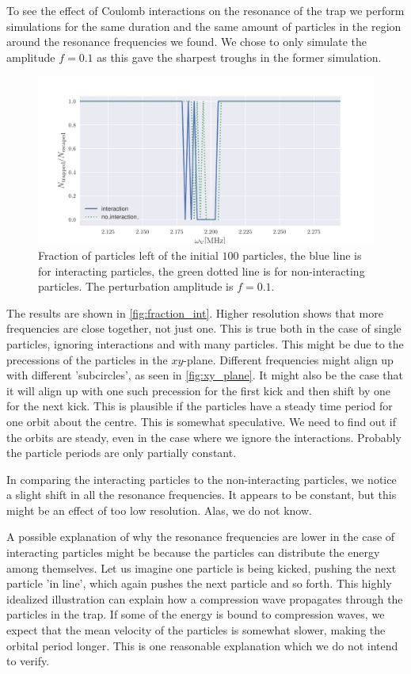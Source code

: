 To see the effect of Coulomb interactions on the resonance of the trap
we perform simulations for the same duration and the same amount of particles
in the region around the resonance frequencies we
found. We chose to only simulate the amplitude $f = 0.1$ as this gave the sharpest troughs
in the former simulation.

\begin{figure}
\centering
\includegraphics[width=1.\linewidth]{../figures/fraction_inter.pdf}
\caption{Fraction of particles left of the initial $100$ particles, the blue line is for interacting particles,
the green dotted line is for non-interacting particles. The perturbation amplitude is $f = 0.1$. }
\label{fig:fraction_int}
\end{figure}

The results are shown in \autoref{fig:fraction_int}.
Higher resolution shows that more frequencies are close together, not just one. This is
true both in the case of single particles, ignoring interactions and with many particles.
This might be due to the precessions of the particles in the $xy$-plane. Different frequencies might align
up with different 'subcircles', as seen in \autoref{fig:xy_plane}. It might also be the case that it will align
up with one such precession for the first kick and then shift by one for the next kick. This is plausible if the
particles have a steady time period for one orbit about the centre.
This is somewhat speculative. We need to find out if the orbits are steady, even in the case where we ignore
the interactions. Probably the particle periods are only partially constant.

In comparing the interacting particles to the non-interacting particles, we notice a slight
shift in all the resonance frequencies. It appears to be constant, but this might be
an effect of too low resolution. Alas, we do not know.

A possible explanation of why the resonance frequencies are lower in the
case of interacting particles might be because the particles can distribute the energy among
themselves. Let us imagine one particle is being kicked, pushing the next particle 'in line', which again
pushes the next particle and so forth. This highly idealized illustration can explain how a
compression wave propagates through the particles in the trap. If some of the energy is bound to
compression waves, we expect that the mean velocity of the particles is somewhat slower, making the
orbital period longer. This is one reasonable explanation which we do not intend to verify.
